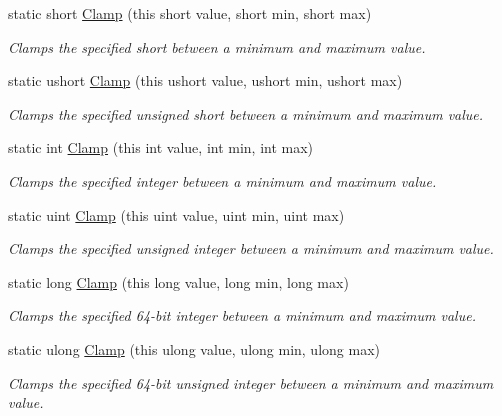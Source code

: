 \begin{DoxyCompactItemize}
\item 
static short \hyperlink{class_tri_devs_1_1_tri_engine_1_1_extensions_1_1_integer_extensions_a89001f67bea2770c4a13660411a55af9}{Clamp} (this short value, short min, short max)
\begin{DoxyCompactList}\small\item\em Clamps the specified short between a minimum and maximum value. \end{DoxyCompactList}\item 
static ushort \hyperlink{class_tri_devs_1_1_tri_engine_1_1_extensions_1_1_integer_extensions_aab33cb02ac813c9cebb7520ddabe77aa}{Clamp} (this ushort value, ushort min, ushort max)
\begin{DoxyCompactList}\small\item\em Clamps the specified unsigned short between a minimum and maximum value. \end{DoxyCompactList}\item 
static int \hyperlink{class_tri_devs_1_1_tri_engine_1_1_extensions_1_1_integer_extensions_a98bb3c930d59ffe20cce47e679de15b0}{Clamp} (this int value, int min, int max)
\begin{DoxyCompactList}\small\item\em Clamps the specified integer between a minimum and maximum value. \end{DoxyCompactList}\item 
static uint \hyperlink{class_tri_devs_1_1_tri_engine_1_1_extensions_1_1_integer_extensions_adc9c97cb58f0db4c860a269562f45ff6}{Clamp} (this uint value, uint min, uint max)
\begin{DoxyCompactList}\small\item\em Clamps the specified unsigned integer between a minimum and maximum value. \end{DoxyCompactList}\item 
static long \hyperlink{class_tri_devs_1_1_tri_engine_1_1_extensions_1_1_integer_extensions_a88f1891557db14db0463ed8750dfb7a3}{Clamp} (this long value, long min, long max)
\begin{DoxyCompactList}\small\item\em Clamps the specified 64-\/bit integer between a minimum and maximum value. \end{DoxyCompactList}\item 
static ulong \hyperlink{class_tri_devs_1_1_tri_engine_1_1_extensions_1_1_integer_extensions_a7c6ef6535be9e11a80f625b17a40a963}{Clamp} (this ulong value, ulong min, ulong max)
\begin{DoxyCompactList}\small\item\em Clamps the specified 64-\/bit unsigned integer between a minimum and maximum value. \end{DoxyCompactList}\end{DoxyCompactItemize}


